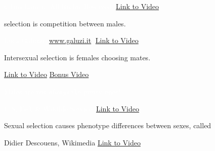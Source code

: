 \documentclass[t]{beamer}
\begin{document}
{
\begin{frame}[b]{\hfill{}}

	\tiny \textcolor{white}{\copyright Tim Laman, All Rights Reserved. 
	\hfill \href{http://www.youtube.com/watch?v=KIYkpwyKEhY}{Link to Video} }
	
\end{frame}
}
%
{
\begin{frame}[b]{ selection is competition between males.}

	\tiny \textcolor{white}{Luca Galuzzi, \href{http://www.galuzi.it}{www.galuzi.it}, 
	\hfill \href{http://www.youtube.com/watch?v=C7HCIGFdBt8}{Link to Video}}

\end{frame}
}
%
{
\begin{frame}[b]{\textcolor{orange5}{Intersexual} \textcolor{white!95!black}{selection is females choosing mates.}}

	\tiny \textcolor{white}{\href{https://youtu.be/IPfW7iolmgc}{Link to Video} 
	\hfill \href{https://youtu.be/1XkPeN3AWIE}{Bonus Video}}
	
\end{frame}
}
%
{
\begin{frame}[b]{\textcolor{white}{Males are not \textit{always} the pretty ones!}}

	\tiny \textcolor{white}{U.S. Fish \& Wildlife Service.
	\hfill \href{https://youtu.be/15ZXpbKrZfI}{Link to Video}}
	
\end{frame}
}
%
{
\begin{frame}[b]{Sexual selection causes phenotype differences between sexes, called }

	\tiny Didier Descouens, Wikimedia 
	\hfill \href{http://www.youtube.com/watch?v=_VBz0FaXN1c}{Link to Video}
	
\end{frame}
}
%
\end{document}
